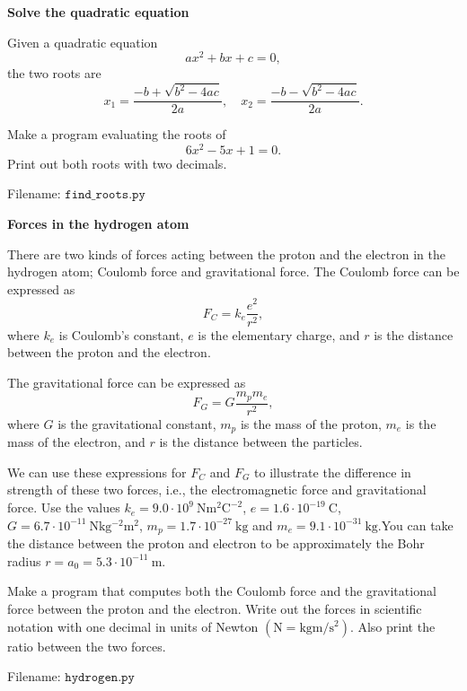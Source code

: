 \newpage
\begin{Problem}{\textbf{Solve the quadratic equation}}\label{prob13}

\noindent Given a quadratic equation
\begin{equation*}
ax^2 +bx + c = 0,
\end{equation*}
the two roots are
\begin{equation*}
x_1 = \frac{-b + \sqrt{b^2 - 4ac}}{2a}, \quad x_2 = \frac{-b - \sqrt{b^2 - 4ac}}{2a}.
\end{equation*}

Make a program evaluating the roots of 
\begin{equation*}
6x^2 - 5x + 1 = 0.
\end{equation*}
Print out both roots with two decimals.

Filename: $\texttt{find\_roots.py}$
\end{Problem}

\begin{Problem}{\textbf{Forces in the hydrogen atom}}\label{prob14}

\noindent There are two kinds of forces acting between the proton and the electron in the
hydrogen atom; Coulomb force and gravitational force. The Coulomb force can be
expressed as
\begin{equation*}
F_C = k_e \frac{e^2}{r^2},
\end{equation*}
where $k_e$ is Coulomb's constant, $e$ is the elementary charge, and $r$ is the
distance between the proton and the electron. 

The gravitational force can be expressed as
\begin{equation*}
F_G = G\frac{m_pm_e}{r^2},
\end{equation*}
where $G$ is the gravitational constant, $m_p$ is the mass of the proton, $m_e$
is the mass of the electron, and $r$ is the distance between the particles.

We can use these expressions for $F_C$ and $F_G$ to illustrate the difference in
strength of these two forces, i.e., the electromagnetic force and gravitational force.
Use the values 
$k_e = 9.0\cdot 10^9 \ \mathrm{Nm^2C^{-2}}$,
$e = 1.6\cdot 10^{-19} \ \mathrm{C}$, $G = 6.7\cdot 10^{-11} \ \mathrm{Nkg^{-2}m^2}$,
$m_p = 1.7\cdot 10^{-27} \ \mathrm{kg}$ and $m_e = 9.1 \cdot 10^{-31} \ \mathrm{kg}$.You can take the distance between the proton and electron to be approximately
the Bohr radius $r = a_0 = 5.3\cdot 10^{-11} \ \mathrm{m}$.

Make a program that computes both the Coulomb force and the gravitational force
between the proton and the electron. Write out the forces in scientific notation
with one decimal in units of Newton $(\mathrm{N = kg m/s^2})$. Also print the
ratio between the two forces. 

Filename: $\texttt{hydrogen.py}$
\end{Problem}


